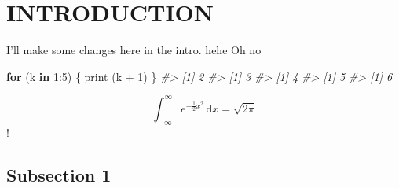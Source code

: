 \documentclass{source/tex/templates/maththesis}
\newenvironment{Shaded}{\begin{snugshade}}{\end{snugshade}}
\newcommand{\CommentTok}[1]{\textcolor[rgb]{0.56,0.35,0.01}{\textit{#1}}}
\newcommand{\ControlFlowTok}[1]{\textcolor[rgb]{0.13,0.29,0.53}{\textbf{#1}}}
\newcommand{\DecValTok}[1]{\textcolor[rgb]{0.00,0.00,0.81}{#1}}
\newcommand{\FunctionTok}[1]{\textcolor[rgb]{0.00,0.00,0.00}{#1}}
\newcommand{\NormalTok}[1]{#1}
\newcommand{\SpecialCharTok}[1]{\textcolor[rgb]{0.00,0.00,0.00}{#1}}
\begin{document}
\listoffigures\newpage
{}

\listoftables\newpage
{}

\hypertarget{introduction}{%
\chapter{INTRODUCTION}\label{introduction}}

I'll make some changes here in the intro. hehe Oh no

\begin{Shaded}
\begin{Highlighting}[]
\ControlFlowTok{for}\NormalTok{ (k }\ControlFlowTok{in} \DecValTok{1}\SpecialCharTok{:}\DecValTok{5}\NormalTok{) \{}
  \FunctionTok{print}\NormalTok{ (k }\SpecialCharTok{+} \DecValTok{1}\NormalTok{)}
\NormalTok{\}}
\CommentTok{\#\textgreater{} [1] 2}
\CommentTok{\#\textgreater{} [1] 3}
\CommentTok{\#\textgreater{} [1] 4}
\CommentTok{\#\textgreater{} [1] 5}
\CommentTok{\#\textgreater{} [1] 6}
\end{Highlighting}
\end{Shaded}

\[
 \int_{-\infty}^{\infty} e^{-\frac{1}{2}x^2}\,\text{d}x = \sqrt{2\pi}
\]!

\hypertarget{subsection-1}{%
\section{Subsection 1}\label{subsection-1}}
\end{document}
